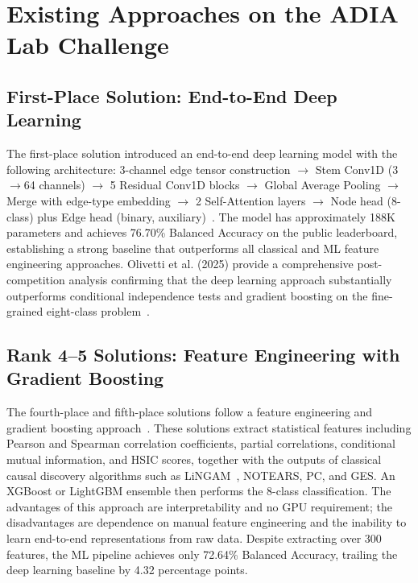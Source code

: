 \section{Existing Approaches on the ADIA Lab Challenge}
\label{sec:existing_approaches}

\subsection{First-Place Solution: End-to-End Deep Learning}
\label{sec:rank1_solution}

The first-place solution introduced an end-to-end deep learning model with the following architecture: 3-channel edge tensor construction $\to$ Stem Conv1D (3$\to$64 channels) $\to$ 5 Residual Conv1D blocks $\to$ Global Average Pooling $\to$ Merge with edge-type embedding $\to$ 2 Self-Attention layers $\to$ Node head (8-class) plus Edge head (binary, auxiliary)~\cite{adia_rank1_report}. The model has approximately 188K parameters and achieves 76.70\% Balanced Accuracy on the public leaderboard, establishing a strong baseline that outperforms all classical and ML feature engineering approaches. Olivetti et al. (2025) provide a comprehensive post-competition analysis confirming that the deep learning approach substantially outperforms conditional independence tests and gradient boosting on the fine-grained eight-class problem~\cite{olivetti2025adialab}.

\subsection{Rank 4--5 Solutions: Feature Engineering with Gradient Boosting}
\label{sec:rank4_5}

The fourth-place and fifth-place solutions follow a feature engineering and gradient boosting approach~\cite{adia_rank4_medium, adia_rank5_medium}. These solutions extract statistical features including Pearson and Spearman correlation coefficients, partial correlations, conditional mutual information, and HSIC scores, together with the outputs of classical causal discovery algorithms such as LiNGAM~\cite{shimizu2006lingam}, NOTEARS, PC, and GES. An XGBoost or LightGBM ensemble then performs the 8-class classification. The advantages of this approach are interpretability and no GPU requirement; the disadvantages are dependence on manual feature engineering and the inability to learn end-to-end representations from raw data. Despite extracting over 300 features, the ML pipeline achieves only 72.64\% Balanced Accuracy, trailing the deep learning baseline by 4.32 percentage points.

